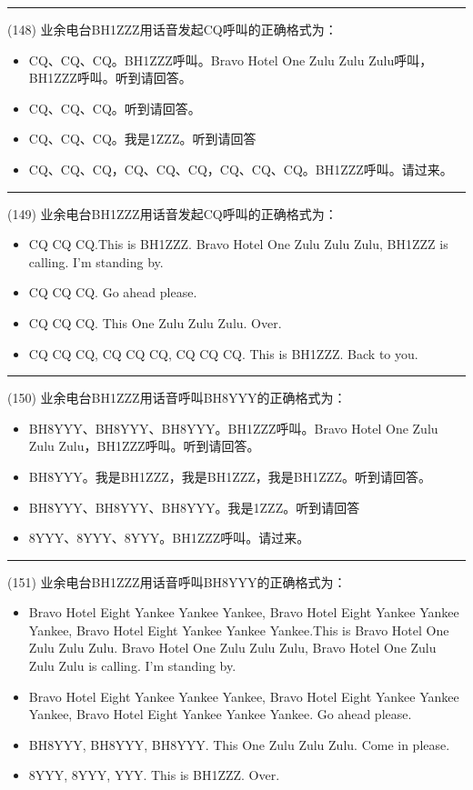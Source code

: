 \documentclass[twocolumn]{ctexart}  %
\begin{document}
\noindent\rule{0.5\textwidth}{1pt}
\heiti (148) 业余电台BH1ZZZ用话音发起CQ呼叫的正确格式为： \songti {\color{gray} [LK0238] }
\begin{itemize}
	\item  CQ、CQ、CQ。BH1ZZZ呼叫。Bravo Hotel One Zulu Zulu Zulu呼叫，BH1ZZZ呼叫。听到请回答。
	\item  CQ、CQ、CQ。听到请回答。
	\item  CQ、CQ、CQ。我是1ZZZ。听到请回答
	\item  CQ、CQ、CQ，CQ、CQ、CQ，CQ、CQ、CQ。BH1ZZZ呼叫。请过来。
\end{itemize}


\noindent\rule{0.5\textwidth}{1pt}
\heiti (149) 业余电台BH1ZZZ用话音发起CQ呼叫的正确格式为： \songti {\color{gray} [LK0239] }
\begin{itemize}
	\item  CQ CQ CQ.This is BH1ZZZ. Bravo Hotel One Zulu Zulu Zulu, BH1ZZZ is calling. I’m standing by.
	\item  CQ CQ CQ. Go ahead please.
	\item  CQ CQ CQ. This One Zulu Zulu Zulu. Over.
	\item  CQ CQ CQ, CQ CQ CQ, CQ CQ CQ. This is BH1ZZZ. Back to you.
\end{itemize}


\noindent\rule{0.5\textwidth}{1pt}
\heiti (150) 业余电台BH1ZZZ用话音呼叫BH8YYY的正确格式为： \songti {\color{gray} [LK0241] }
\begin{itemize}
	\item  BH8YYY、BH8YYY、BH8YYY。BH1ZZZ呼叫。Bravo Hotel One Zulu Zulu Zulu，BH1ZZZ呼叫。听到请回答。
	\item  BH8YYY。我是BH1ZZZ，我是BH1ZZZ，我是BH1ZZZ。听到请回答。
	\item  BH8YYY、BH8YYY、BH8YYY。我是1ZZZ。听到请回答
	\item  8YYY、8YYY、8YYY。BH1ZZZ呼叫。请过来。
\end{itemize}


\noindent\rule{0.5\textwidth}{1pt}
\heiti (151) 业余电台BH1ZZZ用话音呼叫BH8YYY的正确格式为： \songti {\color{gray} [LK0242] }
\begin{itemize}
	\item  Bravo Hotel Eight Yankee Yankee Yankee, Bravo Hotel Eight Yankee Yankee Yankee, Bravo Hotel Eight Yankee Yankee Yankee.This is Bravo Hotel One Zulu Zulu Zulu. Bravo Hotel One Zulu Zulu Zulu, Bravo Hotel One Zulu Zulu Zulu is calling. I’m standing by.
	\item  Bravo Hotel Eight Yankee Yankee Yankee, Bravo Hotel Eight Yankee Yankee Yankee, Bravo Hotel Eight Yankee Yankee Yankee. Go ahead please.
	\item  BH8YYY, BH8YYY, BH8YYY. This One Zulu Zulu Zulu. Come in please.
	\item  8YYY, 8YYY, YYY. This is BH1ZZZ. Over.
\end{itemize}
\end{document}
